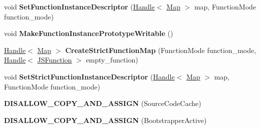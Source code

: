 \begin{DoxyCompactItemize}
\item 
void {\bfseries Set\+Function\+Instance\+Descriptor} (\hyperlink{classv8_1_1internal_1_1_handle}{Handle}$<$ \hyperlink{classv8_1_1internal_1_1_map}{Map} $>$ map, Function\+Mode function\+\_\+mode)\hypertarget{classv8_1_1internal_1_1_b_a_s_e___e_m_b_e_d_d_e_d_a303fcfa55ad2e0527952023f022d5295}{}\label{classv8_1_1internal_1_1_b_a_s_e___e_m_b_e_d_d_e_d_a303fcfa55ad2e0527952023f022d5295}

\item 
void {\bfseries Make\+Function\+Instance\+Prototype\+Writable} ()\hypertarget{classv8_1_1internal_1_1_b_a_s_e___e_m_b_e_d_d_e_d_a0ab65070c835bfaf33dbf8fbb18a701a}{}\label{classv8_1_1internal_1_1_b_a_s_e___e_m_b_e_d_d_e_d_a0ab65070c835bfaf33dbf8fbb18a701a}

\item 
\hyperlink{classv8_1_1internal_1_1_handle}{Handle}$<$ \hyperlink{classv8_1_1internal_1_1_map}{Map} $>$ {\bfseries Create\+Strict\+Function\+Map} (Function\+Mode function\+\_\+mode, \hyperlink{classv8_1_1internal_1_1_handle}{Handle}$<$ \hyperlink{classv8_1_1internal_1_1_j_s_function}{J\+S\+Function} $>$ empty\+\_\+function)\hypertarget{classv8_1_1internal_1_1_b_a_s_e___e_m_b_e_d_d_e_d_a71455e2341e50c8cc854bc8f9bd8bf1f}{}\label{classv8_1_1internal_1_1_b_a_s_e___e_m_b_e_d_d_e_d_a71455e2341e50c8cc854bc8f9bd8bf1f}

\item 
void {\bfseries Set\+Strict\+Function\+Instance\+Descriptor} (\hyperlink{classv8_1_1internal_1_1_handle}{Handle}$<$ \hyperlink{classv8_1_1internal_1_1_map}{Map} $>$ map, Function\+Mode function\+\_\+mode)\hypertarget{classv8_1_1internal_1_1_b_a_s_e___e_m_b_e_d_d_e_d_a2e216f7ab32a2d4582dd37446ef5c951}{}\label{classv8_1_1internal_1_1_b_a_s_e___e_m_b_e_d_d_e_d_a2e216f7ab32a2d4582dd37446ef5c951}

\item 
{\bfseries D\+I\+S\+A\+L\+L\+O\+W\+\_\+\+C\+O\+P\+Y\+\_\+\+A\+N\+D\+\_\+\+A\+S\+S\+I\+GN} (Source\+Code\+Cache)\hypertarget{classv8_1_1internal_1_1_b_a_s_e___e_m_b_e_d_d_e_d_a274a3e02c470e15de39bfa04cf39ec06}{}\label{classv8_1_1internal_1_1_b_a_s_e___e_m_b_e_d_d_e_d_a274a3e02c470e15de39bfa04cf39ec06}

\item 
{\bfseries D\+I\+S\+A\+L\+L\+O\+W\+\_\+\+C\+O\+P\+Y\+\_\+\+A\+N\+D\+\_\+\+A\+S\+S\+I\+GN} (Bootstrapper\+Active)\hypertarget{classv8_1_1internal_1_1_b_a_s_e___e_m_b_e_d_d_e_d_af0da162db1c15dc2523f9f69cb811267}{}\label{classv8_1_1internal_1_1_b_a_s_e___e_m_b_e_d_d_e_d_af0da162db1c15dc2523f9f69cb811267}


\end{DoxyCompactItemize}
